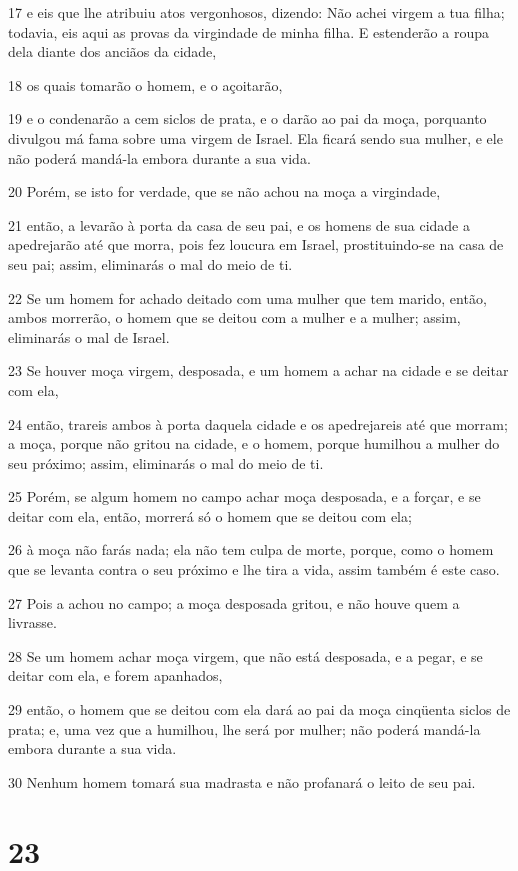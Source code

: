 \par 17 e eis que lhe atribuiu atos vergonhosos, dizendo: Não achei virgem a tua filha; todavia, eis aqui as provas da virgindade de minha filha. E estenderão a roupa dela diante dos anciãos da cidade,
\par 18 os quais tomarão o homem, e o açoitarão,
\par 19 e o condenarão a cem siclos de prata, e o darão ao pai da moça, porquanto divulgou má fama sobre uma virgem de Israel. Ela ficará sendo sua mulher, e ele não poderá mandá-la embora durante a sua vida.
\par 20 Porém, se isto for verdade, que se não achou na moça a virgindade,
\par 21 então, a levarão à porta da casa de seu pai, e os homens de sua cidade a apedrejarão até que morra, pois fez loucura em Israel, prostituindo-se na casa de seu pai; assim, eliminarás o mal do meio de ti.
\par 22 Se um homem for achado deitado com uma mulher que tem marido, então, ambos morrerão, o homem que se deitou com a mulher e a mulher; assim, eliminarás o mal de Israel.
\par 23 Se houver moça virgem, desposada, e um homem a achar na cidade e se deitar com ela,
\par 24 então, trareis ambos à porta daquela cidade e os apedrejareis até que morram; a moça, porque não gritou na cidade, e o homem, porque humilhou a mulher do seu próximo; assim, eliminarás o mal do meio de ti.
\par 25 Porém, se algum homem no campo achar moça desposada, e a forçar, e se deitar com ela, então, morrerá só o homem que se deitou com ela;
\par 26 à moça não farás nada; ela não tem culpa de morte, porque, como o homem que se levanta contra o seu próximo e lhe tira a vida, assim também é este caso.
\par 27 Pois a achou no campo; a moça desposada gritou, e não houve quem a livrasse.
\par 28 Se um homem achar moça virgem, que não está desposada, e a pegar, e se deitar com ela, e forem apanhados,
\par 29 então, o homem que se deitou com ela dará ao pai da moça cinqüenta siclos de prata; e, uma vez que a humilhou, lhe será por mulher; não poderá mandá-la embora durante a sua vida.
\par 30 Nenhum homem tomará sua madrasta e não profanará o leito de seu pai.

\chapter{23}

